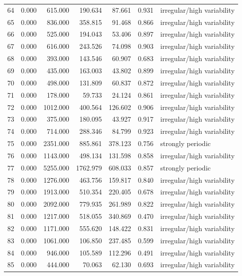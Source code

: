 \begin{longtable}{lrrrrrl}
64 & 0.000 & 615.000 & 190.634 & 87.661 & 0.931 & irregular/high variability \\
65 & 0.000 & 836.000 & 358.815 & 91.468 & 0.866 & irregular/high variability \\
66 & 0.000 & 525.000 & 194.043 & 53.406 & 0.897 & irregular/high variability \\
67 & 0.000 & 616.000 & 243.526 & 74.098 & 0.903 & irregular/high variability \\
68 & 0.000 & 393.000 & 143.546 & 60.907 & 0.683 & irregular/high variability \\
69 & 0.000 & 435.000 & 163.003 & 43.802 & 0.899 & irregular/high variability \\
70 & 0.000 & 498.000 & 131.809 & 60.837 & 0.872 & irregular/high variability \\
71 & 0.000 & 178.000 & 59.733 & 24.124 & 0.861 & irregular/high variability \\
72 & 0.000 & 1012.000 & 400.564 & 126.602 & 0.906 & irregular/high variability \\
73 & 0.000 & 375.000 & 180.095 & 43.927 & 0.917 & irregular/high variability \\
74 & 0.000 & 714.000 & 288.346 & 84.799 & 0.923 & irregular/high variability \\
75 & 0.000 & 2351.000 & 885.861 & 378.123 & 0.756 & strongly periodic \\
76 & 0.000 & 1143.000 & 498.134 & 131.598 & 0.858 & irregular/high variability \\
77 & 0.000 & 5255.000 & 1762.979 & 608.033 & 0.857 & strongly periodic \\
78 & 0.000 & 1276.000 & 463.756 & 159.817 & 0.840 & irregular/high variability \\
79 & 0.000 & 1913.000 & 510.354 & 220.405 & 0.678 & irregular/high variability \\
80 & 0.000 & 2092.000 & 779.935 & 261.989 & 0.822 & irregular/high variability \\
81 & 0.000 & 1217.000 & 518.055 & 340.869 & 0.470 & irregular/high variability \\
82 & 0.000 & 1171.000 & 555.620 & 148.422 & 0.831 & irregular/high variability \\
83 & 0.000 & 1061.000 & 106.850 & 237.485 & 0.599 & irregular/high variability \\
84 & 0.000 & 946.000 & 105.589 & 112.296 & 0.491 & irregular/high variability \\
85 & 0.000 & 444.000 & 70.063 & 62.130 & 0.693 & irregular/high variability \\

\end{longtable}

